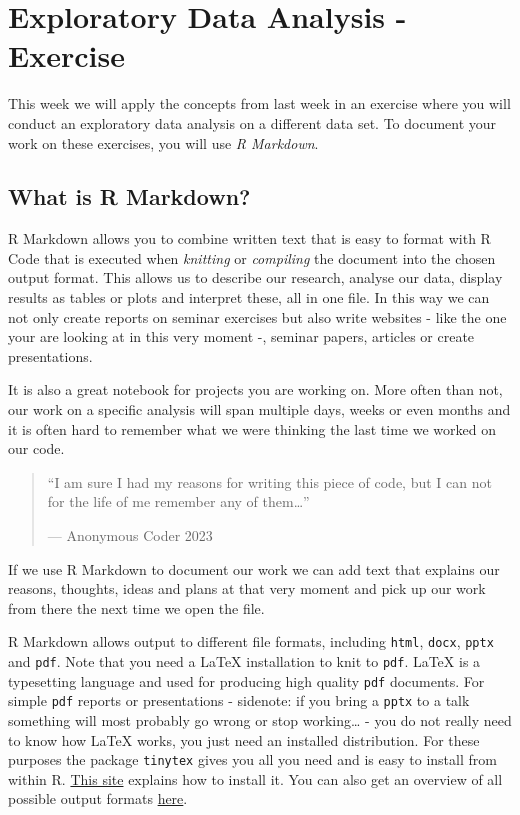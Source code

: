 \documentclass[
]{book}
\begin{document}
\hypertarget{eda-2}{%
\chapter{Exploratory Data Analysis - Exercise}\label{eda-2}}

This week we will apply the concepts from last week in an exercise where you will conduct an exploratory data analysis on a different data set. To document your work on these exercises, you will use \emph{R Markdown}.

\hypertarget{what-is-r-markdown}{%
\section{What is R Markdown?}\label{what-is-r-markdown}}

R Markdown allows you to combine written text that is easy to format with R Code that is executed when \emph{knitting} or \emph{compiling} the document into the chosen output format. This allows us to describe our research, analyse our data, display results as tables or plots and interpret these, all in one file. In this way we can not only create reports on seminar exercises but also write websites - like the one your are looking at in this very moment -, seminar papers, articles or create presentations.

It is also a great notebook for projects you are working on. More often than not, our work on a specific analysis will span multiple days, weeks or even months and it is often hard to remember what we were thinking the last time we worked on our code.

\begin{quote}
``I am sure I had my reasons for writing this piece of code, but I can not for the life of me remember any of them\ldots{}''

--- Anonymous Coder 2023
\end{quote}

If we use R Markdown to document our work we can add text that explains our reasons, thoughts, ideas and plans at that very moment and pick up our work from there the next time we open the file.

R Markdown allows output to different file formats, including \texttt{html}, \texttt{docx}, \texttt{pptx} and \texttt{pdf}. Note that you need a LaTeX installation to knit to \texttt{pdf}. LaTeX is a typesetting language and used for producing high quality \texttt{pdf} documents. For simple \texttt{pdf} reports or presentations - sidenote: if you bring a \texttt{pptx} to a talk something will most probably go wrong or stop working\ldots{} - you do not really need to know how LaTeX works, you just need an installed distribution. For these purposes the package \texttt{tinytex} gives you all you need and is easy to install from within R. \href{https://bookdown.org/yihui/rmarkdown/installation.html\#installation}{This site} explains how to install it. You can also get an overview of all possible output formats \href{https://rmarkdown.rstudio.com/lesson-9.html}{here}.
\end{document}
